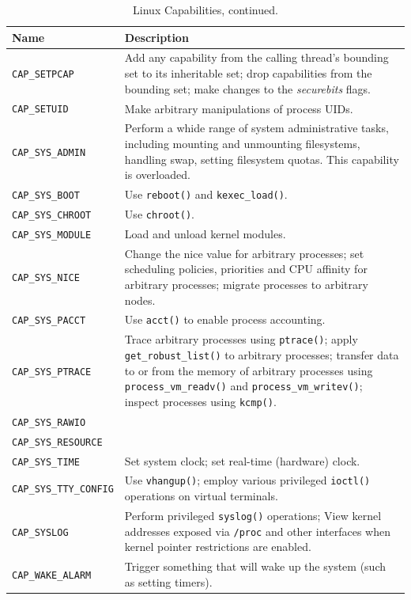 \documentclass[a4paper]{article}
\begin{document}
\begin{table}
\renewcommand{\arraystretch}{1.25}
\centering
\caption{Linux Capabilities, continued.}
\label{tbl:linuxcaps2}
\begin{tabular}{@{}lp{8cm}@{}}
\toprule
Name & Description\\
\midrule
\verb|CAP_SETPCAP| &
Add any capability from the calling thread's bounding set to its inheritable set; drop capabilities from the bounding set; make changes to the \emph{securebits} flags.\\

\verb|CAP_SETUID| &
Make arbitrary manipulations of process UIDs.\\

\verb|CAP_SYS_ADMIN| &
Perform a whide range of system administrative tasks, including mounting and unmounting filesystems, handling swap, setting filesystem quotas. This capability is overloaded.\\

\verb|CAP_SYS_BOOT| &
Use \verb|reboot()| and \verb|kexec_load()|.\\

\verb|CAP_SYS_CHROOT| &
Use \verb|chroot()|.\\

\verb|CAP_SYS_MODULE| &
Load and unload kernel modules.\\

\verb|CAP_SYS_NICE| &
Change the nice value for arbitrary processes; set scheduling policies, priorities and CPU affinity for arbitrary processes; migrate processes to arbitrary nodes.\\

\verb|CAP_SYS_PACCT| &
Use \verb|acct()| to enable process accounting.\\

\verb|CAP_SYS_PTRACE| &
Trace arbitrary processes using \verb|ptrace()|; apply \verb|get_robust_list()| to arbitrary processes; transfer data to or from the memory of arbitrary processes using \verb|process_vm_readv()| and \verb|process_vm_writev()|; inspect processes using \verb|kcmp()|.\\

\verb|CAP_SYS_RAWIO| &
\\

\verb|CAP_SYS_RESOURCE| &
\\

\verb|CAP_SYS_TIME| &
Set system clock; set real-time (hardware) clock.\\

\verb|CAP_SYS_TTY_CONFIG| &
Use \verb|vhangup()|; employ various privileged \verb|ioctl()| operations on virtual terminals.\\

\verb|CAP_SYSLOG| &
Perform privileged \verb|syslog()| operations; View kernel addresses exposed via \texttt{/proc} and other interfaces when kernel pointer restrictions are enabled.\\

\verb|CAP_WAKE_ALARM| &
Trigger something that will wake up the system (such as setting timers).\\
\bottomrule
\end{tabular}
\end{table}
\end{document}
